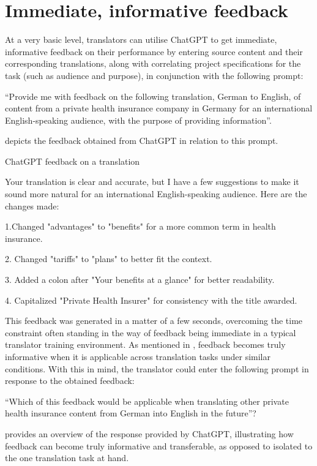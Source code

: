 \documentclass[output=paper]{langscibook}
\begin{document}
\section{Immediate, informative feedback}\label{sec:2:7}

At a very basic level, translators can utilise ChatGPT to get immediate, informative feedback on their performance by entering source content and their corresponding translations, along with correlating project specifications for the task (such as audience and purpose), in conjunction with the following prompt:

\ea\label{ex:2:chatgptfeedback}
“Provide me with feedback on the following translation, German to English, of content from a private health insurance company in Germany for an international English-speaking audience, with the purpose of providing information”.
\z

 depicts the feedback obtained from ChatGPT in relation to this prompt.

\ea \label{extab:2:3}
ChatGPT feedback on a translation

\ttfamily\raggedright
Your translation is clear and accurate, but I have a few suggestions to make it sound more natural for an international English-speaking audience. Here are the changes made:

1.Changed "advantages" to "benefits" for a more common term in health insurance.

2. Changed "tariffs" to "plans" to better fit the context.

3. Added a colon after "Your benefits at a glance" for better readability.

4. Capitalized "Private Health Insurer" for consistency with the title awarded.
\z

This feedback was generated in a matter of a few seconds, overcoming the time constraint often standing in the way of feedback being immediate in a typical translator training environment. As mentioned in , feedback becomes truly informative when it is applicable across translation tasks under similar conditions. With this in mind, the translator could enter the following prompt in response to the obtained feedback:

\ea\label{ex:2:whichfeedback}
“Which of this feedback would be applicable when translating other private health insurance content from German into English in the future”?
\z

 provides an overview of the response provided by ChatGPT, illustrating how feedback can become truly informative and transferable, as opposed to isolated to the one translation task at hand.
\end{document}
